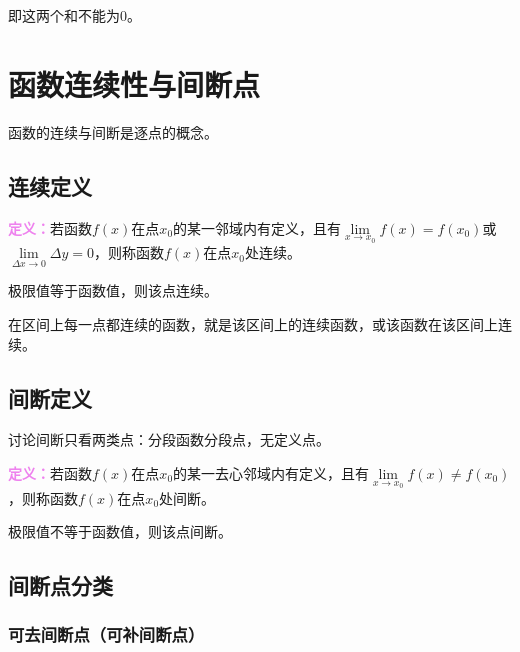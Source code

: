 \documentclass[UTF8, 12pt]{ctexart}
\begin{document}
        即这两个和不能为0。

        \section{函数连续性与间断点}

        函数的连续与间断是逐点的概念。

        \subsection{连续定义}

        \textcolor{violet}{\textbf{定义：}}若函数$f(x)$在点$x_0$的某一邻域内有定义，且有$\lim\limits_{x\to x_0}f(x)=f(x_0)$或$\lim\limits_{\Delta x\to 0}\Delta y=0$，则称函数$f(x)$在点$x_0$处连续。

        极限值等于函数值，则该点连续。

        在区间上每一点都连续的函数，就是该区间上的连续函数，或该函数在该区间上连续。

        \subsection{间断定义}

        讨论间断只看两类点：分段函数分段点，无定义点。

        \textcolor{violet}{\textbf{定义：}}若函数$f(x)$在点$x_0$的某一去心邻域内有定义，且有$\lim\limits_{x\to x_0}f(x)\neq f(x_0)$，则称函数$f(x)$在点$x_0$处间断。

        极限值不等于函数值，则该点间断。

        \subsection{间断点分类}

        \subsubsection{可去间断点（可补间断点）}
\end{document}
